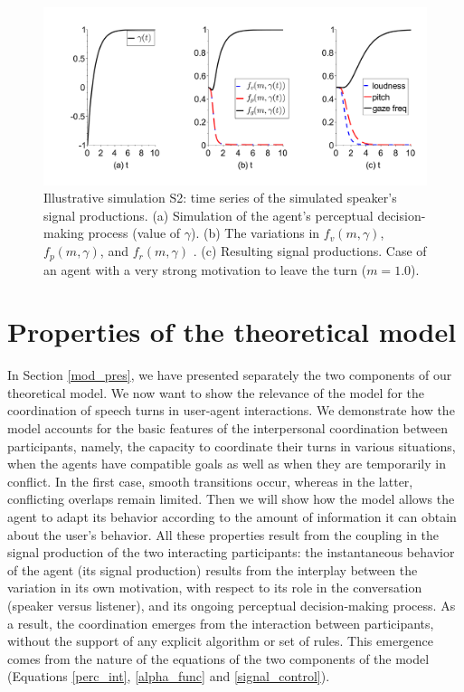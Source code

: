 \documentclass[twocolumn]{svjour3}
\begin{document}
\begin{figure}
  \centering
  \includegraphics[width=\linewidth]{figure/signals_simu_s2b.pdf}
  \caption{Illustrative simulation S2: time series of the simulated speaker's signal productions. (a) Simulation of the agent's perceptual decision-making process (value of $\gamma$). (b) The variations in $f_v(m,\gamma)$, $f_p(m,\gamma)$, and $f_r(m,\gamma)$ . (c) Resulting  signal productions. Case of an agent with a very strong motivation to leave the turn ($m=1.0$).}
  \label{demo_simu}
\end{figure}

\section{Properties of the theoretical model}
\label{mod_analysis}

In Section \ref{mod_pres}, we have presented separately the two components of our theoretical model. 
We now want to show the relevance of the model for the coordination of speech turns in user-agent interactions.
We demonstrate how the model accounts for the basic features of the interpersonal coordination between participants, namely, the capacity to coordinate their turns in various situations, when the agents have compatible goals as well as when they are temporarily in conflict. In the first case, smooth transitions occur, whereas in the latter, conflicting overlaps remain limited.
Then we will show how the model allows the agent to adapt its behavior according to the amount of information it can obtain about the user's behavior.
All these properties result from the coupling in the signal production of the two interacting participants: the instantaneous behavior of the agent (its signal production) results from the interplay between the variation in its own motivation, with respect to its role in the conversation (speaker versus listener), and its ongoing perceptual decision-making process. 
As a result, the coordination emerges from the interaction between participants, without the support of any explicit algorithm or set of rules.
This emergence comes from the nature of the equations of the two components of the model (Equations \ref{perc_int}, \ref{alpha_func} and \ref{signal_control}). 
\end{document}
